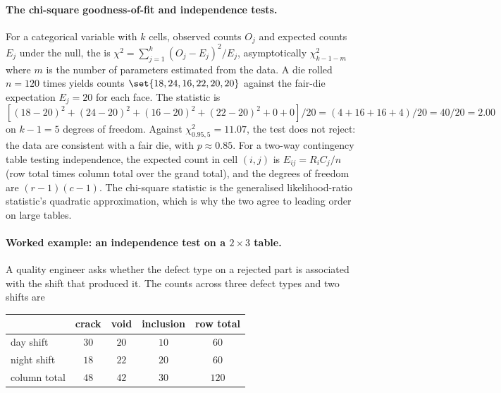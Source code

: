 \paragraph{The chi-square goodness-of-fit and independence tests.}
For a categorical variable with $k$ cells, observed counts $O_{j}$
and expected counts $E_{j}$ under the null, the
 is $\chi^{2} = \sum_{j=1}^{k}
(O_{j} - E_{j})^{2}/E_{j}$, asymptotically $\chi^{2}_{k-1-m}$ where
$m$ is the number of parameters estimated from the data. A die
rolled $n = 120$ times yields counts $\set{18, 24, 16, 22, 20, 20}$
against the fair-die expectation $E_{j} = 20$ for each face. The
statistic is $[(18-20)^{2} + (24-20)^{2} + (16-20)^{2} + (22-20)^{2}
+ 0 + 0]/20 = (4 + 16 + 16 + 4)/20 = 40/20 = 2.00$ on $k - 1 = 5$
degrees of freedom. Against $\chi^{2}_{0.95, 5} = 11.07$, the test
does not reject: the data are consistent with a fair die, with
$p \approx 0.85$. For a two-way contingency table testing
independence, the expected count in cell $(i, j)$ is
$E_{ij} = R_{i}C_{j}/n$ (row total times column total over the
grand total), and the degrees of freedom are $(r-1)(c-1)$. The
chi-square statistic is the generalised likelihood-ratio statistic's
quadratic approximation, which is why the two agree to leading order
on large tables.

\paragraph{Worked example: an independence test on a $2\times3$ table.}
A quality engineer asks whether the defect type on a rejected part is
associated with the shift that produced it. The counts across three
defect types and two shifts are

\begin{center}
\small
\begin{tabular}{lcccc}
\toprule
        & crack & void & inclusion & row total \\
\midrule
day shift   & $30$ & $20$ & $10$ & $60$ \\
night shift & $18$ & $22$ & $20$ & $60$ \\
\midrule
column total & $48$ & $42$ & $30$ & $120$ \\
\bottomrule
\end{tabular}
\end{center}

